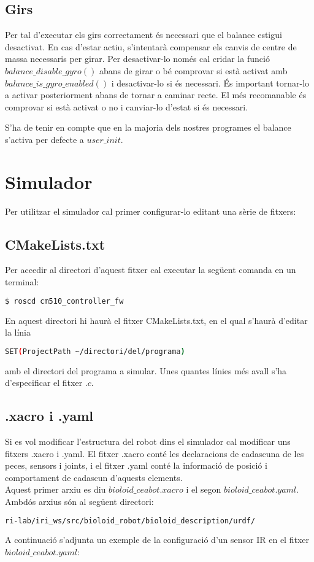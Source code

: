 \documentclass{article}
\begin{document}
\subsection{Girs}
Per tal d'executar els girs correctament és necessari que el balance estigui desactivat. En cas d'estar actiu, s'intentarà compensar els canvis de centre de massa necessaris per girar. Per desactivar-lo només cal cridar la funció $balance\_disable\_gyro()$ abans de girar o bé comprovar si està activat amb $balance\_is\_gyro\_enabled()$ i desactivar-lo si és necessari. És important tornar-lo a activar posteriorment abans de tornar a caminar recte. El més recomanable és comprovar si està activat o no i canviar-lo d'estat si és necessari.

S'ha de tenir en compte que en la majoria dels nostres programes el balance s'activa per defecte a $user\_init$.

\section{Simulador}
Per utilitzar el simulador cal primer configurar-lo editant una sèrie de 
fitxers:
\subsection{CMakeLists.txt}
Per accedir al directori d'aquest fitxer cal executar la següent comanda en un terminal:
\begin{lstlisting}[language=bash]
$ roscd cm510_controller_fw
\end{lstlisting}
En aquest directori hi haurà el fitxer CMakeLists.txt, en el qual s'haurà d'editar la línia 
\begin{lstlisting}[language=bash]
SET(ProjectPath ~/directori/del/programa)
\end{lstlisting} amb el directori del programa a simular. Unes quantes línies més avall s'ha d'especificar el fitxer $.c$.
\subsection{.xacro i .yaml}
Si es vol modificar l'estructura del robot dins el simulador cal modificar uns fitxers .xacro i .yaml. El fitxer .xacro conté les declaracions de cadascuna de les peces, sensors i joints, i el fitxer .yaml conté la informació de posició i comportament de cadascun d'aquests elements. 
\\
Aquest primer arxiu es diu $bioloid\_ceabot.xacro$ i el segon $bioloid\_ceabot.yaml$. Ambdós arxius són al següent directori:
\begin{lstlisting}[language=bash]
ri-lab/iri_ws/src/bioloid_robot/bioloid_description/urdf/
\end{lstlisting}
A continuació s'adjunta un exemple de la configuració d'un sensor IR en el fitxer $bioloid\_ceabot.yaml$:
\end{document}

